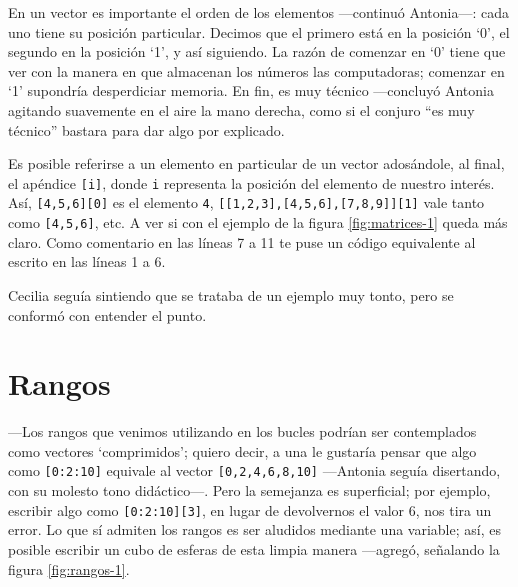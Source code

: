   
  \guillemotright En un vector es importante el orden de los elementos
  ---continuó Antonia---: cada uno tiene su posición
  particular. Decimos que el primero está en la posición `0', el
  segundo en la posición `1', y así siguiendo. La razón de comenzar en
  `0' tiene que ver con la manera en que almacenan los números las
  computadoras; comenzar en `1' supondría desperdiciar memoria. En
  fin, es muy técnico ---concluyó Antonia agitando suavemente en el
  aire la mano derecha, como si el conjuro ``es muy técnico'' bastara
  para dar algo por explicado.

  \guillemotright Es posible referirse a un elemento en particular de
  un vector adosándole, al final, el apéndice \lstinline![i]!, donde
  \lstinline!i! representa la posición del elemento de nuestro
  interés. Así, \lstinline![4,5,6][0]! es el elemento \lstinline!4!,
  \lstinline![[1,2,3],[4,5,6],[7,8,9]][1]!  vale tanto como
  \lstinline![4,5,6]!, etc. A ver si con el ejemplo de la figura
  \ref{fig:matrices-1} queda más claro.  Como comentario en las líneas
  7 a 11 te puse un código equivalente al escrito en las líneas 1 a
  6.

  Cecilia seguía sintiendo que se trataba de un ejemplo muy tonto,
  pero se conformó con entender el punto.


  \section{Rangos}

  ---Los rangos que venimos utilizando en los bucles podrían ser
  contemplados como vectores `comprimidos'; quiero decir, a una le
  gustaría pensar que algo como \lstinline![0:2:10]! equivale al
  vector \lstinline![0,2,4,6,8,10]! ---Antonia seguía disertando, con
  su molesto tono didáctico---. Pero la semejanza es superficial; por
  ejemplo, escribir algo como \lstinline![0:2:10][3]!, en lugar de
  devolvernos el valor 6, nos tira un error. Lo que sí admiten los
  rangos es ser aludidos mediante una variable; así, es posible
  escribir un cubo de esferas de esta limpia manera ---agregó,
  señalando la figura \ref{fig:rangos-1}.


